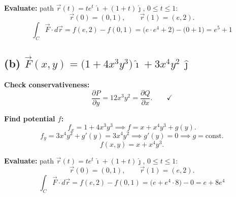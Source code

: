 \documentclass[12pt]{article}
\begin{document}
\textbf{Evaluate:} path $\vec{r}(t)=te^t\,\hat{\imath}+(1+t)\hat{\jmath}$, $0\le t\le1$:
\[
  \vec{r}(0)=(0,1),\qquad\vec{r}(1)=(e,2).
\]
\[
  \int_C\vec{F}\cdot d\vec{r}=f(e,2)-f(0,1)=\bigl(e\cdot e^4+2\bigr)-\bigl(0+1\bigr)=\boxed{e^5+1}
\]

\subsection*{(b) $\vec{F}(x,y)=\bigl(1+4x^3y^3\bigr)\hat{\imath}+3x^4y^2\,\hat{\jmath}$}

\textbf{Check conservativeness:}
\[
  \frac{\partial P}{\partial y}=12x^3y^2=\frac{\partial Q}{\partial x}.\qquad\checkmark
\]

\textbf{Find potential $f$:}
\[
  f_x=1+4x^3y^3\implies f=x+x^4y^3+g(y).
\]
\[
  f_y=3x^4y^2+g'(y)=3x^4y^2\implies g'(y)=0\implies g=\text{const}.
\]
\[
  f(x,y)=x+x^4y^3.
\]

\textbf{Evaluate:} path $\vec{r}(t)=te^t\,\hat{\imath}+(1+t)\hat{\jmath}$, $0\le t\le1$:
\[
  \vec{r}(0)=(0,1),\qquad\vec{r}(1)=(e,2).
\]
\[
  \int_C\vec{F}\cdot d\vec{r}=f(e,2)-f(0,1)=\bigl(e+e^4\cdot8\bigr)-0=\boxed{e+8e^4}
\]
\end{document}
